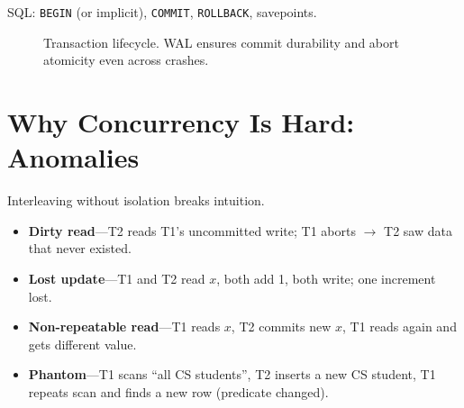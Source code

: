 SQL: \texttt{BEGIN} (or implicit), \texttt{COMMIT}, \texttt{ROLLBACK}, savepoints.

\begin{figure}[h]
\centering
{}
\caption{Transaction lifecycle. WAL ensures commit durability and abort atomicity even across crashes.}
\label{fig:txn-lifecycle}
\end{figure}

\section{Why Concurrency Is Hard: Anomalies}
\label{sec:anomalies}

Interleaving without isolation breaks intuition.

\begin{itemize}
    \item \textbf{Dirty read}---T2 reads T1's uncommitted write; T1 aborts $\to$ T2 saw data that never existed.
    \item \textbf{Lost update}---T1 and T2 read $x$, both add 1, both write; one increment lost.
    \item \textbf{Non-repeatable read}---T1 reads $x$, T2 commits new $x$, T1 reads again and gets different value.
    \item \textbf{Phantom}---T1 scans ``all CS students'', T2 inserts a new CS student, T1 repeats scan and finds a new row (predicate changed).
\end{itemize}

